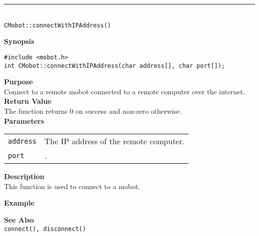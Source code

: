 \noindent
\vspace{5pt}
\rule{4.5in}{0.015in} \\
\noindent
{\LARGE \texttt{CMobot::connectWithIPAddress()}}\\
{}

\noindent
{\bf Synopsis}
\vspace{-8pt}
\begin{verbatim}
#include <mobot.h>
int CMobot::connectWithIPAddress(char address[], char port[]);
\end{verbatim}

\noindent
{\bf Purpose}\\
Connect to a remote mobot connected to a remote computer over the internet.\\

\noindent
{\bf Return Value}\\
The function returns 0 on success and non-zero otherwise.\\

\noindent
{\bf Parameters}
\vspace{-0.1in}
\begin{description}
\item               
\begin{tabular}{p{10 mm}p{145 mm}}
\texttt{address} & The IP address of the remote computer. \\
\texttt{port} & . \\
\end{tabular}
\end{description}

\noindent
{\bf Description}\\
This function is used to connect to a mobot. 

\noindent
{\bf Example}\\
\noindent

\noindent
{\bf See Also}\\
\texttt{connect(), disconnect()}

